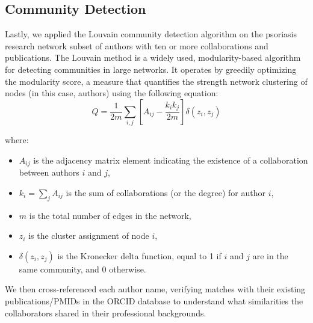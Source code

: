 \documentclass[9pt,twocolumn,twoside]{pnas-new}
\begin{document}
\subsection*{Community Detection}
Lastly, we applied the Louvain community detection algorithm on the psoriasis research network subset of authors with ten or more collaborations and publications. The Louvain method is a widely used, modularity-based algorithm for detecting communities in large networks. It operates by greedily optimizing the modularity score, a measure that quantifies the strength network clustering of nodes (in this case, authors) using the following equation: 
\[
Q = \frac{1}{2m} \sum_{i,j} \left[ A_{ij} - \frac{k_i k_j}{2m} \right] \delta(z_i, z_j)
\]

where:
\begin{itemize}
\setlength{\itemsep}{0pt}
\setlength{\parsep}{0pt}
    \item \( A_{ij} \) is the adjacency matrix element indicating the existence of a collaboration between authors \( i \) and \( j \),
    \item \( k_i = \sum_j A_{ij} \) is the sum of collaborations (or the degree) for author \( i \),
    \item \( m \) is the total number of edges in the network,
    \item \( z_i \) is the cluster assignment of node \( i \),
    \item \( \delta(z_i, z_j) \) is the Kronecker delta function, equal to 1 if \( i \) and \( j \) are in the same community, and 0 otherwise.
\end{itemize}

\newline

\noindent We then cross-referenced each author name, verifying matches with their existing publications/PMIDs in the ORCID database to  understand what similarities the collaborators shared in their professional backgrounds. 
\end{document}
